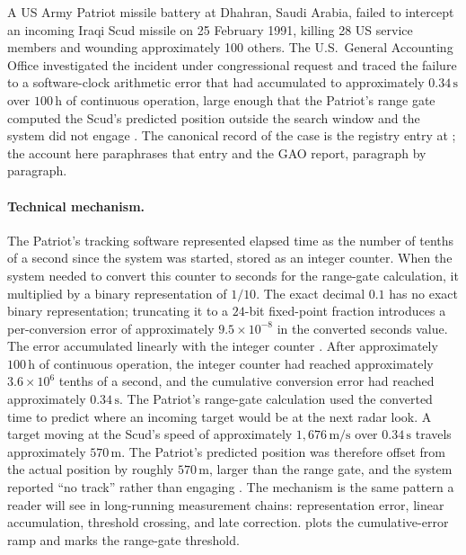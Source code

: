 A US Army Patriot missile battery at Dhahran, Saudi Arabia, failed
to intercept an incoming Iraqi Scud missile on 25 February 1991,
killing 28 US service members and wounding approximately 100
others. The U.S.\ General Accounting Office investigated the
incident under congressional request and traced the failure to a
software-clock arithmetic error that had accumulated to
approximately $0.34 \,\si{\second}$ over $100 \,\si{\hour}$ of
continuous operation, large enough that the Patriot's range gate
computed the Scud's predicted position outside the search window
and the system did not engage \cite{acc:gao-patriot-1992}. The
canonical record of the case is the registry entry at
; the
account here paraphrases that entry and the GAO report, paragraph
by paragraph.

\paragraph{Technical mechanism.}
The Patriot's tracking software represented elapsed time as the
number of tenths of a second since the system was started, stored
as an integer counter. When the system needed to convert this
counter to seconds for the range-gate calculation, it multiplied
by a binary representation of $1/10$. The exact decimal $0.1$ has
no exact binary representation; truncating it to a $24$-bit
fixed-point fraction introduces a per-conversion error of
approximately $9.5 \times 10^{-8}$ in the converted seconds value.
The error accumulated linearly with the integer counter
\cite{acc:gao-patriot-1992}. After approximately $100 \,\si
{\hour}$ of continuous operation, the integer counter had reached
approximately $3.6 \times 10^{6}$ tenths of a second, and the
cumulative conversion error had reached approximately $0.34 \,\si
{\second}$. The Patriot's range-gate calculation used the
converted time to predict where an incoming target would be at the
next radar look. A target moving at the Scud's speed of
approximately $1{,}676 \,\si{\meter\per\second}$ over $0.34 \,\si
{\second}$ travels approximately $570 \,\si{\meter}$. The
Patriot's predicted position was therefore offset from the actual
position by roughly $570 \,\si{\meter}$, larger than the range
gate, and the system reported ``no track'' rather than engaging
\cite{acc:gao-patriot-1992}. The mechanism is the same pattern a
reader will see in long-running measurement chains:
representation error, linear accumulation, threshold crossing, and
late correction.  plots the
cumulative-error ramp and marks the range-gate threshold.

